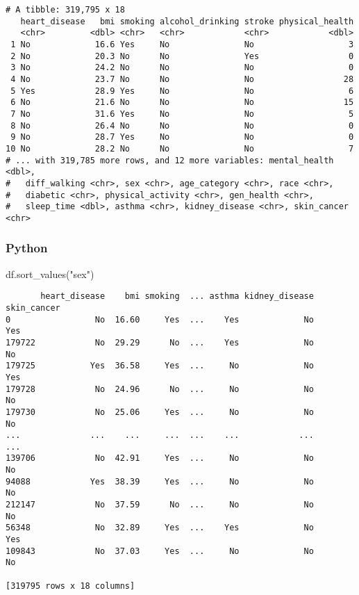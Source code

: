 \documentclass[
  letterpaper,
  DIV=11,
  numbers=noendperiod]{scrreprt}
\newenvironment{Shaded}{\begin{snugshade}}{\end{snugshade}}
\newcommand{\NormalTok}[1]{\textcolor[rgb]{0.00,0.46,0.62}{#1}}
\newcommand{\StringTok}[1]{\textcolor[rgb]{0.13,0.47,0.30}{#1}}
\begin{document}
\begin{verbatim}
# A tibble: 319,795 x 18
   heart_disease   bmi smoking alcohol_drinking stroke physical_health
   <chr>         <dbl> <chr>   <chr>            <chr>            <dbl>
 1 No             16.6 Yes     No               No                   3
 2 No             20.3 No      No               Yes                  0
 3 No             24.2 No      No               No                   0
 4 No             23.7 No      No               No                  28
 5 Yes            28.9 Yes     No               No                   6
 6 No             21.6 No      No               No                  15
 7 No             31.6 Yes     No               No                   5
 8 No             26.4 No      No               No                   0
 9 No             28.7 Yes     No               No                   0
10 No             28.2 No      No               No                   7
# ... with 319,785 more rows, and 12 more variables: mental_health <dbl>,
#   diff_walking <chr>, sex <chr>, age_category <chr>, race <chr>,
#   diabetic <chr>, physical_activity <chr>, gen_health <chr>,
#   sleep_time <dbl>, asthma <chr>, kidney_disease <chr>, skin_cancer <chr>
\end{verbatim}

\hypertarget{python-23}{%
\subsubsection{Python}\label{python-23}}

\begin{Shaded}
\begin{Highlighting}[]
\NormalTok{df.sort\_values(}\StringTok{"sex"}\NormalTok{)}
\end{Highlighting}
\end{Shaded}

\begin{verbatim}
       heart_disease    bmi smoking  ... asthma kidney_disease  skin_cancer
0                 No  16.60     Yes  ...    Yes             No          Yes
179722            No  29.29      No  ...    Yes             No           No
179725           Yes  36.58     Yes  ...     No             No          Yes
179728            No  24.96      No  ...     No             No           No
179730            No  25.06     Yes  ...     No             No           No
...              ...    ...     ...  ...    ...            ...          ...
139706            No  42.91     Yes  ...     No             No           No
94088            Yes  38.39     Yes  ...     No             No           No
212147            No  37.59      No  ...     No             No           No
56348             No  32.89     Yes  ...    Yes             No          Yes
109843            No  37.03     Yes  ...     No             No           No

[319795 rows x 18 columns]
\end{verbatim}
\end{document}
